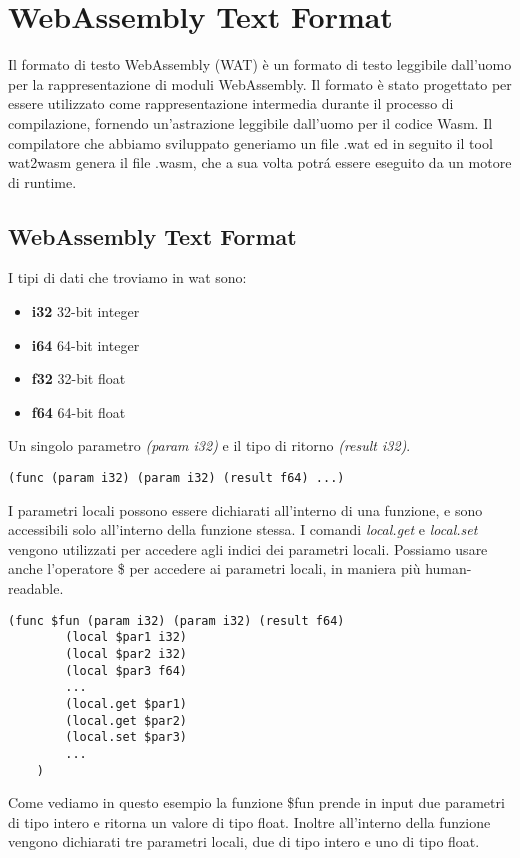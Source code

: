 \documentclass[../../main.tex]{subfiles}
\begin{document}
\section{WebAssembly Text Format}
Il formato di testo WebAssembly (WAT) \cite{WebAssemblyTextFormat} è un formato di testo leggibile dall'uomo per la rappresentazione di moduli WebAssembly. Il formato è stato progettato per essere utilizzato come rappresentazione intermedia durante il processo di compilazione, fornendo un'astrazione leggibile dall'uomo per il codice Wasm.
Il compilatore che abbiamo sviluppato generiamo un file .wat ed in seguito il tool wat2wasm \cite{jain2022webassembly} genera il file .wasm, che a sua volta potrá essere eseguito da un motore di runtime.

\subsection{WebAssembly Text Format }
I tipi di dati che troviamo in wat sono:
\begin{itemize}
    \item \textbf{i32} 32-bit integer
    \item \textbf{i64} 64-bit integer
    \item \textbf{f32} 32-bit float
    \item \textbf{f64} 64-bit float
\end{itemize}
Un singolo  parametro \textit{(param i32)} e il tipo di ritorno \textit{(result i32)}.
\begin{lstlisting}[language=WebAssembly, caption={Esempio di funzione in wat}, label={lst:funzioneWat}]
    (func (param i32) (param i32) (result f64) ...)
\end{lstlisting}
I parametri locali possono essere dichiarati all'interno di una funzione, e sono accessibili solo all'interno della funzione stessa.
I comandi \textit{local.get} e \textit{local.set} vengono utilizzati per accedere agli indici dei parametri locali.
Possiamo usare anche l'operatore \$ per accedere ai parametri locali, in maniera più human-readable.
\begin{lstlisting}[language=WebAssembly, caption={Esempio di funzione in wat}, label={lst:funzioneWat}]
    (func $fun (param i32) (param i32) (result f64)
        (local $par1 i32)
        (local $par2 i32)
        (local $par3 f64)
        ...
        (local.get $par1)
        (local.get $par2)
        (local.set $par3)
        ...
    )
\end{lstlisting}
Come vediamo in questo esempio la funzione \$fun prende in input due parametri di tipo intero e ritorna un valore di tipo float. Inoltre all'interno della funzione vengono dichiarati tre parametri locali, due di tipo intero e uno di tipo float.
\end{document}
